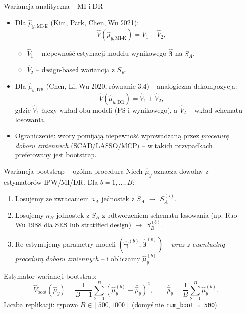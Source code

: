 \documentclass[10pt,ignorenonframetext, aspectratio=169]{beamer}
\newcommand{\bbeta}{\boldsymbol{\beta}}
\newcommand{\bgamma}{\boldsymbol{\gamma}}
\begin{document}
\begin{frame}{Wariancja analityczna -- MI i DR}
\begin{itemize}
\justifying
    \item Dla $\hat{\mu}_{y,\text{MI-K}}$ (Kim, Park, Chen, Wu 2021):
    \begin{equation*}
        \hat{V}(\hat{\mu}_{y,\text{MI-K}}) = \hat{V}_1 + \hat{V}_2,
    \end{equation*}
    \begin{itemize}
        \item $\hat{V}_1$ -- niepewność estymacji modelu wynikowego $\hat{\bbeta}$ na $S_A$,
        \item $\hat{V}_2$ -- design-based wariancja z $S_B$.
    \end{itemize}
    \item Dla $\hat{\mu}_{y,\text{DR}}$ (Chen, Li, Wu 2020, równanie 3.4) -- analogiczna dekompozycja:
    \begin{equation*}
        \hat{V}(\hat{\mu}_{y,\text{DR}}) = \hat{V}_1 + \hat{V}_2,
    \end{equation*}
    gdzie $\hat{V}_1$ łączy wkład obu modeli (PS i wynikowego), a $\hat{V}_2$ -- wkład schematu losowania.
    \item Ograniczenie: wzory pomijają niepewność wprowadzaną przez \emph{procedurę doboru zmiennych} (SCAD/LASSO/MCP) -- w takich przypadkach preferowany jest bootstrap.
\end{itemize}
\end{frame}

\begin{frame}{Wariancja bootstrap -- ogólna procedura}
Niech $\hat{\mu}_y$ oznacza dowolny z estymatorów IPW/MI/DR. Dla $b = 1, \ldots, B$:
\begin{enumerate}
\justifying
    \item Losujemy ze zwracaniem $n_A$ jednostek z $S_A$ $\rightarrow$ $S_A^{(b)}$.
    \item Losujemy $n_B$ jednostek z $S_B$ z odtworzeniem schematu losowania (np. Rao-Wu 1988 dla SRS lub stratified design) $\rightarrow$ $S_B^{(b)}$.
    \item Re-estymujemy parametry modeli $(\hat{\bgamma}^{(b)}, \hat{\bbeta}^{(b)})$ -- \emph{wraz z ewentualną procedurą doboru zmiennych} -- i obliczamy $\hat{\mu}_y^{(b)}$.
\end{enumerate}
Estymator wariancji bootstrap:
\begin{equation}
    \hat{V}_{\text{boot}}(\hat{\mu}_y) = \frac{1}{B-1} \sum_{b=1}^{B} \left(\hat{\mu}_y^{(b)} - \bar{\hat{\mu}}_y\right)^{\!2}, \qquad \bar{\hat{\mu}}_y = \frac{1}{B}\sum_{b=1}^{B}\hat{\mu}_y^{(b)}.
\end{equation}
Liczba replikacji: typowo $B \in [500, 1000]$ (domyślnie \texttt{num\_boot = 500}).
\end{frame}
\end{document}
